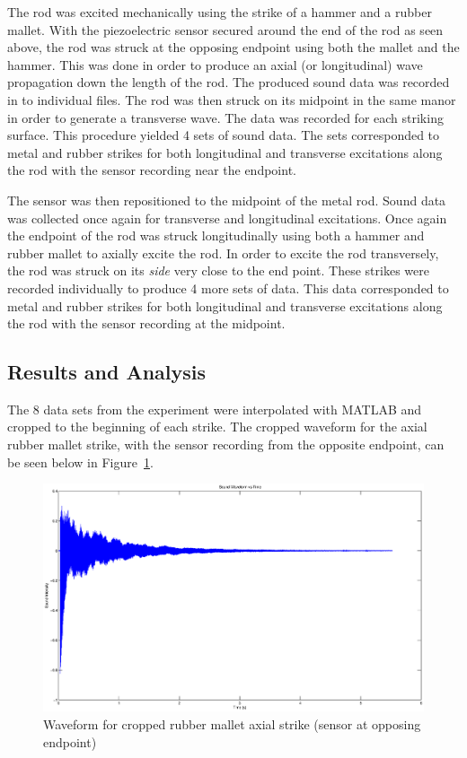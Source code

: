 The rod was excited mechanically using the strike of a hammer and a rubber mallet. With the piezoelectric sensor secured around the end of the rod as seen above, the rod was struck at the opposing endpoint using both the mallet and the hammer. This was done in order to produce an axial (or longitudinal) wave propagation down the length of the rod. The produced sound data was recorded in to individual files. The rod was then struck on its midpoint in the same manor in order to generate a transverse wave. The data was recorded for each striking surface. This procedure yielded 4 sets of sound data. The sets corresponded to metal and rubber strikes for both longitudinal and transverse excitations along the rod with the sensor recording near the endpoint. 

The sensor was then repositioned to the midpoint of the metal rod. Sound data was collected once again for transverse and longitudinal excitations. Once again the endpoint of the rod was struck longitudinally using both a hammer and rubber mallet to axially excite the rod. In order to excite the rod transversely, the rod was struck on its \emph{side} very close to the end point. These strikes were recorded individually to produce 4 more sets of data. This data corresponded to metal and rubber strikes for both longitudinal and transverse excitations along the rod with the sensor recording at the midpoint. 

\subsection{Results and Analysis}

The 8 data sets from the experiment were interpolated with MATLAB and cropped to the beginning of each strike. The cropped waveform for the axial rubber mallet strike, with the sensor recording from the opposite endpoint, can be seen below in Figure~\ref{fig:axial_endpoint}.

\begin{figure}[H]
	\centering
	\includegraphics[width=\textwidth]{../figures/axial_rubber_endpoint.eps}
	\caption{Waveform for cropped rubber mallet axial strike (sensor at opposing endpoint)}
	\label{fig:axial_endpoint}
\end{figure}
	
